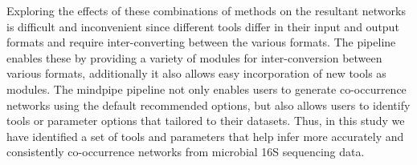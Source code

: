 
Exploring the effects of these combinations of methods on the resultant networks is difficult and inconvenient since different tools differ in their input and output formats and require inter-converting between the various formats.
The pipeline enables these by providing a variety of modules for inter-conversion between various formats, additionally it also allows easy incorporation of new tools as modules.
The mindpipe pipeline not only enables users to generate co-occurrence networks using the default recommended options, but also allows users to identify tools or parameter options that tailored to their datasets.
Thus, in this study we have identified a set of tools and parameters that help infer more accurately and consistently co-occurrence networks from microbial 16S sequencing data.


